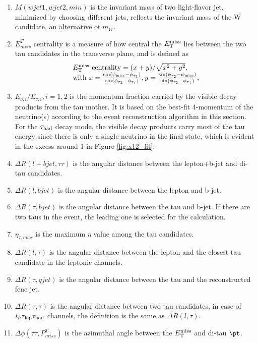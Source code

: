 \begin{enumerate}
\item $M(wjet1,wjet2,min)$ is the invariant mass of two light-flavor jet, minimized by choosing different jets, reflects the invariant mass of the W candidate, an alternative of $m_{W}$.
\item $E^{T}_{miss}$ centrality is a measure of how central the $E_{\text{T}}^{\text{miss}}$ lies between the two tau candidates in the transverse plane, and is defined as
\begin{eqnarray}
\begin{array}{l}
E_{\text{T}}^{\text{miss}}~\text{centrality} = {(x+y)}/{\sqrt{x^2+y^2}}, \\
\text{with}~x=\frac{\sin(\phi_{\text{miss}}-\phi_{\tau_1})}{\sin(\phi_{\tau_2}-\phi_{\tau_1})},  y=\frac{\sin(\phi_{\tau_2}-\phi_{\text{miss}})}{\sin(\phi_{\tau_2}-\phi_{\tau_1})} ,
\end{array}
\label{eq:eq3}
\end{eqnarray}
\item $E_{\nu,i}/E_{\tau,i},i=1,2$ is the momentum fraction carried by the visible decay products from the tau mother. It is based on the best-fit 4-momentum of the neutrino(s) according to the event reconstruction algorithm in this section. For the $\tau_\text{had}$ decay mode, the visible decay products carry most of the tau energy since there is only a single neutrino in the final state, which is evident in the excess around 1 in Figure \ref{fig:x12_fit}. 
\item $\Delta R(l+bjet,\tau\tau)$ is the angular distance between the lepton+b-jet and di-tau candidates.
\item $\Delta R(l,bjet)$ is the angular distance between the lepton and b-jet.
\item $\Delta R(\tau,bjet)$ is the angular distance between the tau and b-jet. If there are two taus in the event, the leading one is selected for the calculation.
\item $\eta_{\tau,max}$ is the maximum $\eta$ value among the tau candidates.
\item $\Delta R(l,\tau)$ is the angular distance between the lepton and the closest tau candidate in the leptonic channels.
\item $\Delta R(\tau,qjet)$ is the angular distance between the tau and the reconstructed fcnc jet.
\item $\Delta R(\tau,\tau)$ is the angular distance between two tau candidates, in case of $t_h\tau_\text{lep}{}\tau_\text{had}$ channels, the definition is the same as $\Delta R(l,\tau)$.
\item $\Delta\phi(\tau\tau,P^{T}_{miss})$ is the azimuthal angle between the $E_{\text{T}}^{\text{miss}}$ and di-tau $\pt$.


\end{enumerate}
